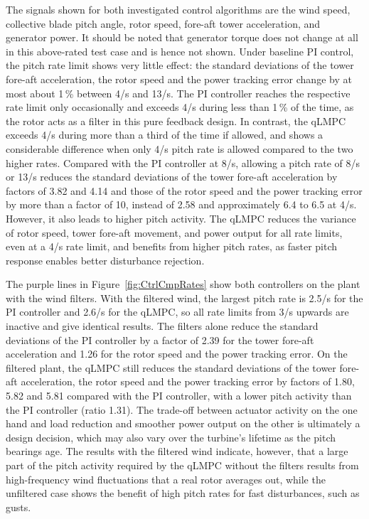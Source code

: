 The signals shown for both investigated control algorithms are the wind speed, collective blade pitch angle, rotor speed, fore-aft tower acceleration, and generator power. It should be noted that generator torque does not change at all in this above-rated test case and is hence not shown. Under baseline PI control, the pitch rate limit shows very little effect: the standard deviations of the tower fore-aft acceleration, the rotor speed and the power tracking error change by at most about 1\,\% between 4\textdegree/s and 13\textdegree/s. The PI controller reaches the respective rate limit only occasionally and exceeds 4\textdegree/s during less than 1\,\% of the time, as the rotor acts as a filter in this pure feedback design. In contrast, the qLMPC exceeds 4\textdegree/s during more than a third of the time if allowed, and shows a considerable difference when only 4\textdegree/s pitch rate is allowed compared to the two higher rates. Compared with the PI controller at 8\textdegree/s, allowing a pitch rate of 8\textdegree/s or 13\textdegree/s reduces the standard deviations of the tower fore-aft acceleration by factors of 3.82 and 4.14 and those of the rotor speed and the power tracking error by more than a factor of 10, instead of 2.58 and approximately 6.4 to 6.5 at 4\textdegree/s. However, it also leads to higher pitch activity. The qLMPC reduces the variance of rotor speed, tower fore-aft movement, and power output for all rate limits, even at a 4\textdegree/s rate limit, and benefits from higher pitch rates, as faster pitch response enables better disturbance rejection.

The purple lines in Figure~\ref{fig:CtrlCmpRates} show both controllers on the plant with the wind filters. With the filtered wind, the largest pitch rate is 2.5\textdegree/s for the PI controller and 2.6\textdegree/s for the qLMPC, so all rate limits from 3\textdegree/s upwards are inactive and give identical results. The filters alone reduce the standard deviations of the PI controller by a factor of 2.39 for the tower fore-aft acceleration and 1.26 for the rotor speed and the power tracking error. On the filtered plant, the qLMPC still reduces the standard deviations of the tower fore-aft acceleration, the rotor speed and the power tracking error by factors of 1.80, 5.82 and 5.81 compared with the PI controller, with a lower pitch activity than the PI controller (ratio 1.31). The trade-off between actuator activity on the one hand and load reduction and smoother power output on the other is ultimately a design decision, which may also vary over the turbine's lifetime as the pitch bearings age. The results with the filtered wind indicate, however, that a large part of the pitch activity required by the qLMPC without the filters results from high-frequency wind fluctuations that a real rotor averages out, while the unfiltered case shows the benefit of high pitch rates for fast disturbances, such as gusts.


